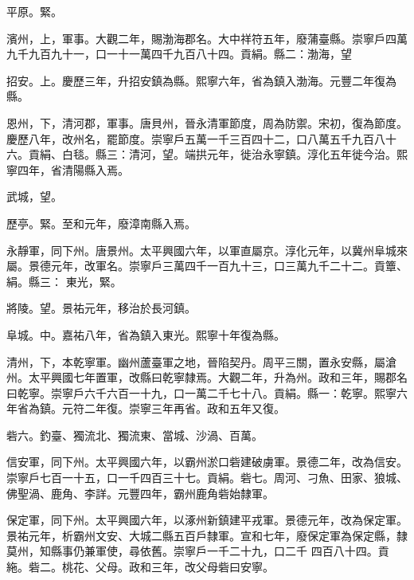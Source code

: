 \begin{pinyinscope}
 平原。緊。



 濱州，上，軍事。大觀二年，賜渤海郡名。大中祥符五年，廢蒲臺縣。崇寧戶四萬九千九百九十一，口一十一萬四千九百八十四。貢絹。縣二：渤海，望



 招安。上。慶歷三年，升招安鎮為縣。熙寧六年，省為鎮入渤海。元豐二年復為縣。



 恩州，下，清河郡，軍事。唐貝州，晉永清軍節度，周為防禦。宋初，復為節度。慶歷八年，改州名，罷節度。崇寧戶五萬一千三百四十二，口八萬五千九百八十六。貢絹、白毯。縣三：清河，望。端拱元年，徙治永寧鎮。淳化五年徙今治。熙寧四年，省清陽縣入焉。



 武城，望。



 歷亭。緊。至和元年，廢漳南縣入焉。



 永靜軍，同下州。唐景州。太平興國六年，以軍直屬京。淳化元年，以冀州阜城來屬。景德元年，改軍名。崇寧戶三萬四千一百九十三，口三萬九千二十二。貢簟、絹。縣三：
 東光，緊。



 將陵。望。景祐元年，移治於長河鎮。



 阜城。中。嘉祐八年，省為鎮入東光。熙寧十年復為縣。



 清州，下，本乾寧軍。幽州蘆臺軍之地，晉陷契丹。周平三關，置永安縣，屬滄州。太平興國七年置軍，改縣曰乾寧隸焉。大觀二年，升為州。政和三年，賜郡名曰乾寧。崇寧戶六千六百一十九，口一萬二千七十八。貢絹。縣一：乾寧。熙寧六年省為鎮。元符二年復。崇寧三年再省。政和五年又復。



 砦六。釣臺、獨流北、獨流東、當城、沙渦、百萬。



 信安軍，同下州。太平興國六年，以霸州淤口砦建破虜軍。景德二年，改為信安。崇寧戶七百一十五，口一千四百三十七。貢絹。砦七。周河、刁魚、田家、狼城、佛聖渦、鹿角、李詳。元豐四年，霸州鹿角砦始隸軍。



 保定軍，同下州。太平興國六年，以涿州新鎮建平戎軍。景德元年，改為保定軍。景祐元年，析霸州文安、大城二縣五百戶隸軍。宣和七年，廢保定軍為保定縣，隸莫州，知縣事仍兼軍使，尋依舊。崇寧戶一千二十九，口二千
 四百八十四。貢絁。砦二。桃花、父母。政和三年，改父母砦曰安寧。




\end{pinyinscope}
